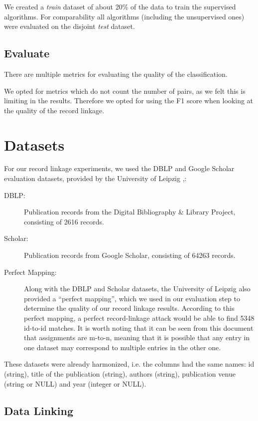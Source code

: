 \documentclass[sigconf,nonacm]{acmart}
\begin{document}
We created a \emph{train} dataset of about 20\% of the data to train
the supervised algorithms.
For comparability all algorithms (including the unsupervised ones)
were evaluated on the disjoint \emph{test} dataset.

\subsection{Evaluate}

There are multiple metrics for evaluating the quality of the classification.

We opted for metrics which do not count the number of pairs, as we felt
this is limiting in the results.
Therefore we opted for using the F1 score when looking at the quality
of the record linkage.

\section{Datasets}

For our record linkage experiments, we used the DBLP and Google Scholar evaluation datasets, provided by the University of Leipzig \cite{DataSets},\cite{kopcke2010evaluation}:

\begin{description}
\item[DBLP:] Publication records from the Digital Bibliography \& Library Project, consisting of 2616 records.  
\item[Scholar:] Publication records from Google Scholar, consisting of 64263 records.
\item[Perfect Mapping:] Along with the DBLP and Scholar datasets, the University of Leipzig also provided a ``perfect mapping'', which we used in our evaluation step to determine the quality of our record linkage results. According to this perfect mapping, a perfect record-linkage attack would be able to find 5348 id-to-id matches. It is worth noting that it can be seen from this document that assignments are m-to-n, meaning that it is possible that any entry in one dataset may correspond to multiple entries in the other one.
\end{description}

These datasets were already harmonized, i.e. the columns had the same names: id (string), title of the publication (string), authors (string), publication venue (string or NULL) and year (integer or NULL).

\subsection{Data Linking}
\end{document}
